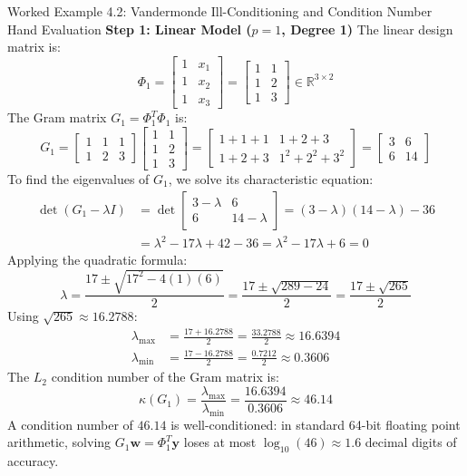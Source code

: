 \begin{examplebox}{Worked Example 4.2: Vandermonde Ill-Conditioning and Condition Number Hand Evaluation}
\textbf{Step 1: Linear Model ($p = 1$, Degree 1)}
The linear design matrix is:
\begin{equation*}
\Phi_1 = \begin{bmatrix} 1 & x_1 \\ 1 & x_2 \\ 1 & x_3 \end{bmatrix} = \begin{bmatrix} 1 & 1 \\ 1 & 2 \\ 1 & 3 \end{bmatrix} \in \mathbb{R}^{3 \times 2}
\end{equation*}
The Gram matrix $G_1 = \Phi_1^T \Phi_1$ is:
\begin{equation*}
G_1 = \begin{bmatrix} 1 & 1 & 1 \\ 1 & 2 & 3 \end{bmatrix} \begin{bmatrix} 1 & 1 \\ 1 & 2 \\ 1 & 3 \end{bmatrix} = \begin{bmatrix} 1+1+1 & 1+2+3 \\ 1+2+3 & 1^2+2^2+3^2 \end{bmatrix} = \begin{bmatrix} 3 & 6 \\ 6 & 14 \end{bmatrix}
\end{equation*}
To find the eigenvalues of $G_1$, we solve its characteristic equation:
\begin{align*}
\det(G_1 - \lambda I) &= \det\begin{bmatrix} 3 - \lambda & 6 \\ 6 & 14 - \lambda \end{bmatrix} = (3 - \lambda)(14 - \lambda) - 36 \\
&= \lambda^2 - 17\lambda + 42 - 36 = \lambda^2 - 17\lambda + 6 = 0
\end{align*}
Applying the quadratic formula:
\begin{equation*}
\lambda = \frac{17 \pm \sqrt{17^2 - 4(1)(6)}}{2} = \frac{17 \pm \sqrt{289 - 24}}{2} = \frac{17 \pm \sqrt{265}}{2}
\end{equation*}
Using $\sqrt{265} \approx 16.2788$:
\begin{align*}
\lambda_{\max} &= \frac{17 + 16.2788}{2} = \frac{33.2788}{2} \approx 16.6394 \\
\lambda_{\min} &= \frac{17 - 16.2788}{2} = \frac{0.7212}{2} \approx 0.3606
\end{align*}
The $L_2$ condition number of the Gram matrix is:
\begin{equation*}
\kappa(G_1) = \frac{\lambda_{\max}}{\lambda_{\min}} = \frac{16.6394}{0.3606} \approx \mathbf{46.14}
\end{equation*}
A condition number of $46.14$ is well-conditioned: in standard 64-bit floating point arithmetic, solving $G_1 \mathbf{w} = \Phi_1^T \mathbf{y}$ loses at most $\log_{10}(46) \approx 1.6$ decimal digits of accuracy.


\end{examplebox}
